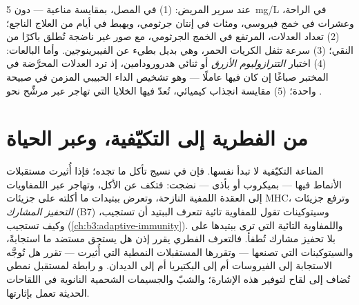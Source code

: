 \begin{method}\label{met:b3:innate-immunity:tests}
عند سرير المريض: (1) \emph{} في المصل،
بمقايسة مناعية --- دون \qty{5}{mg/L} في الراحة، وعشرات في
خمج فيروسي، ومئات في إنتان جرثومي، ويهبط في أيام من العلاج
الناجع؛ (2) تعداد العدلات، المرتفع في الخمج الجرثومي، مع
صور غير ناضجة تُطلق باكرًا من النقي؛ (3) سرعة تثفل الكريات
الحمر، وهي بديل بطيء عن الفيبرينوجين. وأما البالعات: (4)
اختبار \emph{التترازوليوم الأزرق} أو ثنائي هدرورودامين، إذ
ترد العدلات المحرَّضة في المختبر صباغًا إن كان  فيها عاملًا --- وهو تشخيص الداء الحبيبي المزمن في
صبيحة واحدة؛ (5) مقايسة انجذاب كيميائي، تُعدّ فيها الخلايا
التي تهاجر عبر مرشِّح نحو .
\end{method}

\section{من الفطرية إلى التكيّفية، وعبر الحياة}

\begin{proposition}\label{prop:b3:innate-immunity:bridge}
المناعة التكيّفية لا تبدأ نفسها. فإن \emph{}
في نسيج تأكل ما تجده؛ فإذا أُثيرت مستقبلات الأنماط فيها ---
بميكروب أو بأذى --- نضجت: فتكف عن الأكل، وتهاجر عبر
اللمفاويات إلى العقدة اللمفية النازحة، وتعرض ببتيدات ما
أكلته على جزيئات MHC، وترفع جزيئات \emph{التحفيز المشارك}
(B7) وسيتوكينات تقول للمفاوية تائية تتعرف الببتيد أن تستجيب،
وكيف تستجيب (\cref{ch:b3:adaptive-immunity}).
واللمفاوية التائية التي ترى ببتيدها على  بلا
تحفيز مشارك تُطفأ. فالتعرف الفطري يقرر إذن هل يستحق مستضد
ما استجابةً، والسيتوكينات التي تصنعها  ---
وتقررها المستقبلات النمطية التي أُثيرت --- تقرر هل تُوجَّه
الاستجابة إلى الفيروسات أم إلى البكتيريا أم إلى الديدان.
و\emph{} رابطة لمستقبل نمطي تُضاف إلى لقاح
لتوفير هذه الإشارة؛ والشبّ والجسيمات الشحمية النانوية في
اللقاحات الحديثة تعمل بإثارتها.
\end{proposition}

